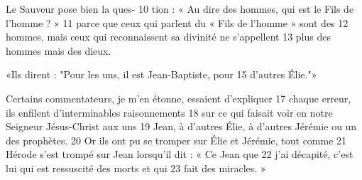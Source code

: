 Le Sauveur pose bien la ques-	 
10	 	tion : « Au dire des hommes, qui est le Fils de l'homme ? »	 
11	 	parce que ceux qui parlent du « Fils de l'homme » sont des	 
12	 	hommes, mais ceux qui reconnaissent sa divinité ne s'appellent	 
13	 	plus des hommes mais des dieux.

«Ils dirent : "Pour les uns, il est Jean-Baptiste, pour	 
15	 	d'autres Élie."»

Certains commentateurs, je m'en étonne, essaient d'expliquer	 
17	 	chaque erreur, ils enfilent d'interminables raisonnements	 
18	 	sur ce qui faisait voir en notre Seigneur Jésus-Christ aux uns	 
19	 	Jean, à d'autres Élie, à d'autres Jérémie ou un des prophètes.	 
20	 	Or ils ont pu se tromper sur Élie et Jérémie, tout comme	 
21	 	Hérode s'est trompé sur Jean lorsqu'il dit : « Ce Jean que	 
22	 	j'ai décapité, c'est lui qui est ressuscité des morts et qui	 
23	 	fait des miracles. »
